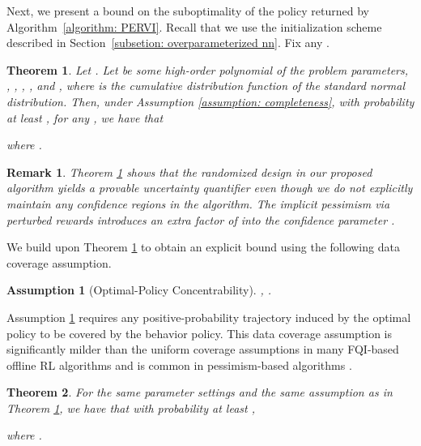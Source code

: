 \documentclass{article} \usepackage{iclr2023/iclr2023_conference,times}
\newtheorem{assumption}{Assumption}[section]
\newtheorem{theorem}{Theorem}
\newtheorem{remark}{Remark}
\begin{document}
Next, we present a bound on the suboptimality of the policy  returned by Algorithm~\ref{algorithm: PERVI}. Recall that we use the initialization scheme described in Section~\ref{subsetion: overparameterized nn}. Fix any . \
\begin{theorem}
Let .  
Let { be some high-order polynomial of the problem parameters}, , , ,
, 
and , where  is the cumulative distribution function of the standard normal distribution. Then, under Assumption \ref{assumption: completeness}, with probability at least , for any , we have that 

where .







\label{theorem: main theorem}
\end{theorem}

\begin{remark}
Theorem \ref{theorem: main theorem} shows that the randomized design in our proposed algorithm yields a provable uncertainty quantifier even though we do not explicitly maintain any confidence regions in the algorithm. {The implicit pessimism via perturbed rewards introduces an extra factor of  into the confidence parameter .} 
\label{remark: simplified params}
\end{remark}


We build upon Theorem \ref{theorem: main theorem} to obtain an explicit bound using the following data coverage assumption. 
\begin{assumption}[Optimal-Policy Concentrability]
,  . 


\label{assumption: OPC}
\end{assumption}
Assumption \ref{assumption: OPC} requires any positive-probability trajectory induced by the optimal policy to be covered by the behavior policy. This data coverage assumption is significantly milder than the uniform coverage assumptions in many FQI-based offline RL algorithms \citep{DBLP:journals/jmlr/MunosS08,chen2019information,nguyentang2021sample} and is common in pessimism-based algorithms \citep{rashidinejad2021bridging,nguyen2021offline,Chen2022OfflineRL,zhan2022offline}. 
\begin{theorem}
For the same parameter settings and the same assumption as in Theorem \ref{theorem: main theorem}, we have that 
with probability at least ,

where . 
\label{theorem: explicit bound}
\end{theorem}
\end{document}

